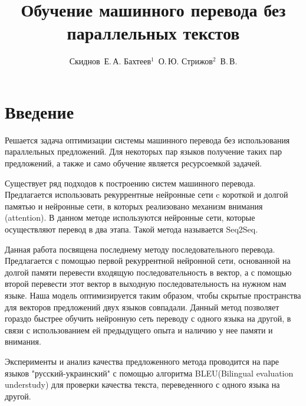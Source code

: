\documentclass[12pt,twoside]{article}
\title
    [Обучение машинного перевода без параллельных текстов] %
    {Обучение машинного перевода без параллельных текстов}
\author
    [Скиднов~Е.\,А. Бахтеев$^1$~О.\,Ю.  Стрижов$^2$~В.\,В.] %
    {Скиднов~Е.\,А. Бахтеев$^1$~О.\,Ю.  Стрижов$^2$~В.\,В.} %
    [Скиднов~Е.\,А. Бахтеев$^1$~О.\,Ю.  Стрижов$^2$~В.\,В.] %
\begin{document}
\maketitle

\section{Введение}
{Решается задача оптимизации системы машинного перевода без использования параллельных предложений. Для некоторых пар языков получение таких пар предложений, а также и само обучение является ресурсоемкой задачей. 

Существует ряд подходов к построению систем машинного перевода. Предлагается использовать рекуррентные нейронные сети c короткой и долгой памятью и нейронные сети, в которых реализовано механизм внимания (attention). В данном методе используются нейронные сети, которые осуществляют перевод в два этапа. Такой метода называется Seq2Seq.

Данная работа посвящена последнему методу последовательного перевода. Предлагается с помощью первой рекуррентной нейронной сети, основанной на долгой памяти перевести входящую последовательность в вектор, а с помощью второй перевести этот вектор в выходную последовательность на нужном нам языке. Наша модель оптимизируется таким образом, чтобы скрытые пространства для векторов предложений двух языков совпадали.
 Данный метод позволяет гораздо быстрее обучить нейронную сеть переводу с одного языка на другой, в связи с использованием ей предыдущего опыта и наличию у нее памяти и внимания.

Эксперименты и анализ качества предложенного метода проводится на паре языков "русский-украинский" с помощью алгоритма BLEU(Bilingual evaluation understudy) для проверки качества текста, переведенного с одного языка на другой.}
\end{document}
